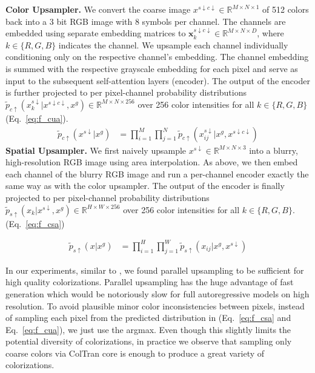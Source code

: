 \documentclass{article} \usepackage{iclr2021_conference,times}
\newcommand{\bb}[1]{\mathbf{#1}}
\newcommand{\bx}{\bb{x}}
\newcommand{\da}{{\scriptscriptstyle\downarrow}}
\newcommand{\ua}{{\scriptscriptstyle\uparrow}}
\begin{document}
\textbf{Color Upsampler.}
We convert the coarse image $x^{s\da c\da} \in \mathbb{R}^{M \times N {\times} 1}$ of 512 colors back into a 3 bit RGB image with 8 symbols per channel. The channels are embedded using separate embedding matrices to $\bx_k^{s\da c\da} \in \mathbb{R}^{M \times N {\times} D}$, where $k \in {\{R,G,B\}}$ indicates the channel. We upsample each channel individually conditioning only on the respective channel's embedding. The channel embedding is summed with the respective grayscale embedding for each pixel and serve as input to the subsequent self-attention layers (encoder). The output of the encoder is further projected to per pixel-channel probability distributions $\widetilde{p}_{c\ua}(x_k^{s\da}|x^{s\da c\da}, x^g) \in \mathbb{R}^{M \times N {\times} 256}$ over 256 color intensities for all $k \in {\{R,G,B\}}$ (Eq.~\ref{eq:f_cua}).
\begin{align}
  \widetilde{p}_{c\ua}(x^{s\da}|x^g) &= \prod_{i=1}^M\prod_{j=1}^N \widetilde{p}_{c\ua}(x^{s\da}_{ij} | x^{g}, x^{s\da c\da}) \label{eq:f_cua}
\end{align}
\textbf{Spatial Upsampler.} We first naively upsample $x^{s\da} \in \mathbb{R}^{M \times N {\times} 3}$ into a blurry, high-resolution RGB image using area interpolation. As above, we then embed each channel of the blurry RGB image and run a per-channel encoder exactly the same way as with the color upsampler. The output of the encoder is finally projected to per pixel-channel probability distributions $\widetilde{p}_{s\ua}(x_k|x^{s\da}, x^g) \in \mathbb{R}^{H \times W {\times} 256}$ over 256 color intensities for all $k \in {\{R,G,B\}}$. (Eq.~\ref{eq:f_csa})


\begin{align}
  \widetilde{p}_{s\ua}(x|x^g) &= \prod_{i=1}^H\prod_{j=1}^W \widetilde{p}_{s\ua}(x_{ij} | x^{g}, x^{s\da}) \label{eq:f_csa} 
\end{align}

In our experiments, similar to \citep{guadarrama2017pixcolor}, we found parallel upsampling to be sufficient for high quality colorizations. Parallel upsampling has the huge advantage of fast generation which would be notoriously slow for full autoregressive models on high resolution. To avoid plausible minor color inconsistencies between pixels, instead of sampling each pixel from the predicted distribution in (Eq.~\ref{eq:f_csa} and Eq.~\ref{eq:f_cua}), we just use the argmax. Even though this slightly limits the potential diversity of colorizations, in practice we observe that sampling only coarse colors via ColTran core is enough to produce a great variety of colorizations. 
\end{document}
